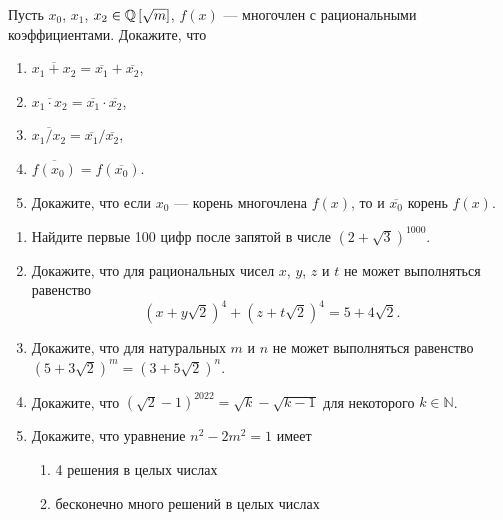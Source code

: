 \documentclass{article}
\begin{document}
    \begin{exercise}
        Пусть $x_0$, $x_1$, $x_2\in \mathbb{Q}\left[\sqrt{m}\right]$, $f(x)$ --- многочлен с рациональными коэффициентами.
        Докажите, что
        \begin{enumerate}[label*=\alph*)]
            \item $\overline{x_1+x_2}=\overline{x_1}+\overline{x_2}$,
            \item $\overline{x_1\cdot x_2}=\overline{x_1}\cdot \overline{x_2}$,
            \item $\overline{x_1/x_2}=\overline{x_1}/\overline{x_2}$,
            \item $\overline{f(x_0)}=f(\overline{x_0})$.
            \item Докажите, что если $x_0$ --- корень многочлена $f(x)$, то и $\overline{x_0}$ корень $f(x)$.
        \end{enumerate}
    \end{exercise}

    \begin{enumerate}[label*=\protect\fbox{\arabic{enumi}}]

        \item Найдите первые 100 цифр после запятой в числе $(2+\sqrt{3})^{1000}$.

        \item Докажите, что для рациональных чисел $x$, $y$, $z$ и $t$ не может выполняться равенство
        \[\left(x+y\sqrt{2}\right)^4+\left(z+t\sqrt{2}\right)^4=5+4\sqrt{2}.\]

        \item Докажите, что для натуральных $m$ и $n$ не может выполняться равенство
        $(5+3\sqrt{2})^m=\left(3+5\sqrt{2}\right)^n$.

        \item Докажите, что $(\sqrt{2}-1)^{2022}=\sqrt{k}-\sqrt{k-1}$ для некоторого $k\in \mathbb{N}$.

        \item Докажите, что уравнение $n^2-2m^2 = 1$ имеет
        \begin{enumerate}
            \item 4 решения в целых числах
            \item бесконечно много решений в целых числах
        \end{enumerate}
    \end{enumerate}
\end{document}
